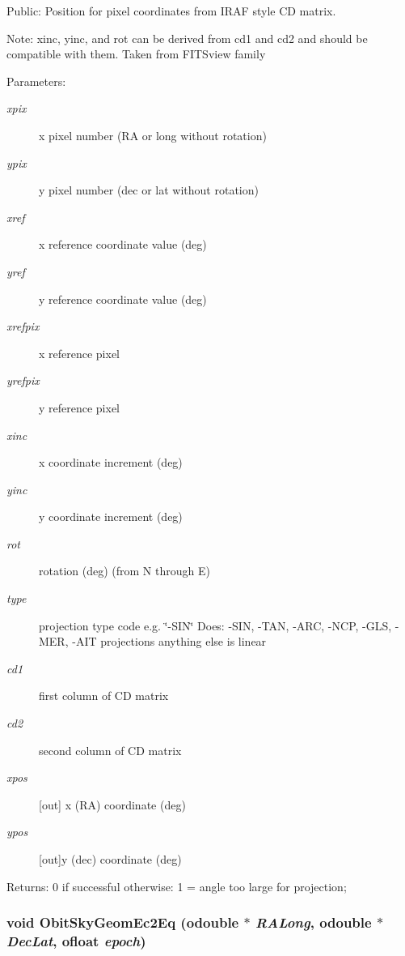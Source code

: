 Public: Position for pixel coordinates from IRAF style CD matrix. 

Note: xinc, yinc, and rot can be derived from cd1 and cd2 and should be compatible with them. Taken from FITSview family \begin{Desc}
\item[Parameters:]
\begin{description}
\item[{\em xpix}]x pixel number (RA or long without rotation) \item[{\em ypix}]y pixel number (dec or lat without rotation) \item[{\em xref}]x reference coordinate value (deg) \item[{\em yref}]y reference coordinate value (deg) \item[{\em xrefpix}]x reference pixel \item[{\em yrefpix}]y reference pixel \item[{\em xinc}]x coordinate increment (deg) \item[{\em yinc}]y coordinate increment (deg) \item[{\em rot}]rotation (deg) (from N through E) \item[{\em type}]projection type code e.g. \char`\"{}-SIN\char`\"{} Does: -SIN, -TAN, -ARC, -NCP, -GLS, -MER, -AIT projections anything else is linear \item[{\em cd1}]first column of CD matrix \item[{\em cd2}]second column of CD matrix \item[{\em xpos}][out] x (RA) coordinate (deg) \item[{\em ypos}][out]y (dec) coordinate (deg) \end{description}
\end{Desc}
\begin{Desc}
\item[Returns:]0 if successful otherwise: 1 = angle too large for projection; \end{Desc}
\subsubsection{\setlength{\rightskip}{0pt plus 5cm}void Obit\-Sky\-Geom\-Ec2Eq ({\bf odouble} $\ast$ {\em RALong}, {\bf odouble} $\ast$ {\em Dec\-Lat}, {\bf ofloat} {\em epoch})}\label{ObitSkyGeom_8c_a19}


